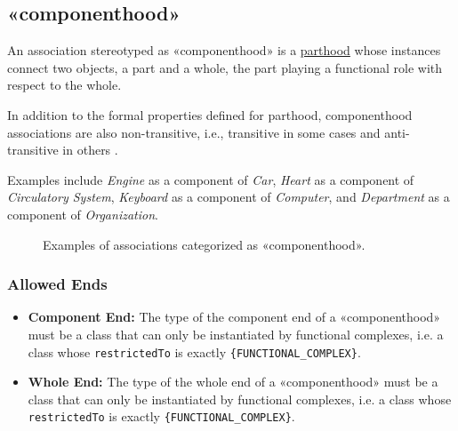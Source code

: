 


\subsection{«componenthood»}
\label{stereotype:componenthood}

An association stereotyped as «componenthood» is a \hyperref[stereotype:parthood]{parthood} whose instances connect two objects, a part and a whole, the part playing a functional role with respect to the whole.

In addition to the formal properties defined for parthood, componenthood associations are also non-transitive, i.e., transitive in some cases and anti-transitive in others \cite{guizzardi2009transitivity}. 

Examples include \textit{Engine} as a component of \textit{Car}, \textit{Heart} as a component of \textit{Circulatory System}, \textit{Keyboard} as a component of \textit{Computer}, and \textit{Department} as a component of \textit{Organization}.


\begin{figure}[h]
    \centering
    
    \caption{Examples of associations categorized as «componenthood».}
    \label{fig:componenthood-example}
\end{figure}

\subsubsection{Allowed Ends}

\begin{itemize}
    \item \textbf{Component End:} The type of the component end of a «componenthood» must be a class that can only be instantiated by functional complexes, i.e. a class whose  \texttt{restrictedTo} is exactly \texttt{\{FUNCTIONAL\_COMPLEX\}}.
    \item \textbf{Whole End:} The type of the whole end of a «componenthood» must be a class that can only be instantiated by functional complexes, i.e. a class whose  \texttt{restrictedTo} is exactly \texttt{\{FUNCTIONAL\_COMPLEX\}}.
\end{itemize}

